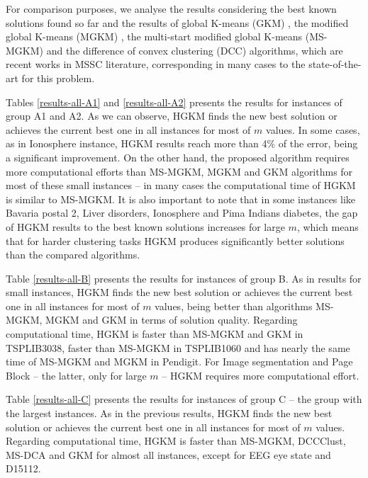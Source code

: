 For comparison purposes, we analyse the results considering the best known solutions found so far and the results of global K-means (GKM) \cite{Likas2003}, the modified global K-means (MGKM) \cite{Bagirov2008}, the multi-start modified global K-means (MS-MGKM) \cite{Ordin2014} and the difference of convex clustering (DCC) \cite{Bagirov2016} algorithms, which are recent works in MSSC literature, corresponding in many cases to the state-of-the-art for this problem.

Tables \ref{results-all-A1} and \ref{results-all-A2} presents the results for instances of group A1 and A2. As we can observe, HGKM finds the new best solution or achieves the current best one in all instances for most of $m$ values. In some cases, as in Ionosphere instance, HGKM results reach more than 4\% of the error, being a significant improvement. On the other hand, the proposed algorithm requires more computational efforts than MS-MGKM, MGKM and GKM algorithms for most of these small instances -- in many cases the computational time of HGKM is similar to MS-MGKM. It is also important to note that in some instances like Bavaria postal 2, Liver disorders, Ionosphere and Pima Indians diabetes, the gap of HGKM results to the best known solutions increases for large $m$, which means that for harder clustering tasks HGKM produces significantly better solutions than the compared algorithms.

Table \ref{results-all-B} presents the results for instances of group B. As in results for small instances, HGKM finds the new best solution or achieves the current best one in all instances for most of $m$ values, being better than algorithms MS-MGKM, MGKM and GKM in terms of solution quality. Regarding computational time, HGKM is faster than MS-MGKM and GKM in TSPLIB3038, faster than MS-MGKM in TSPLIB1060 and has nearly the same time of MS-MGKM and MGKM in Pendigit. For Image segmentation and Page Block -- the latter, only for large $m$ -- HGKM requires more computational effort.

Table \ref{results-all-C} presents the results for instances of group C -- the group with the largest instances. As in the previous results, HGKM finds the new best solution or achieves the current best one in all instances for most of $m$ values. Regarding computational time, HGKM is faster than MS-MGKM, DCCClust, MS-DCA and GKM for almost all instances, except for EEG eye state and D15112.



